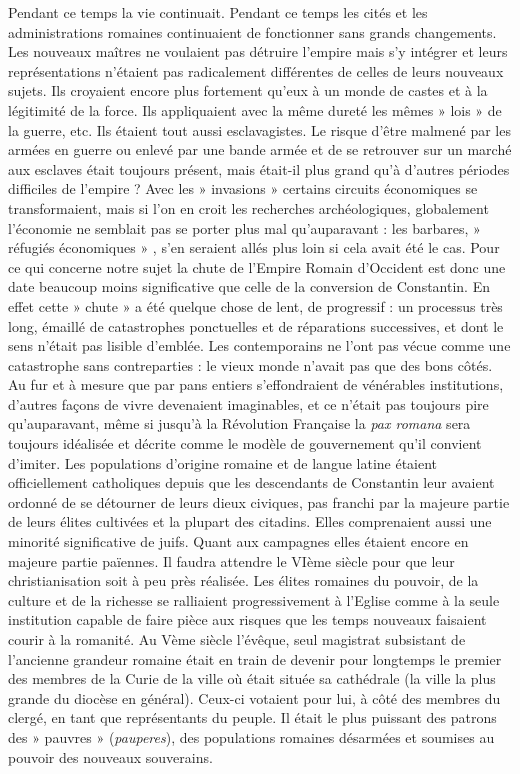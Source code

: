  Pendant ce temps la vie continuait. Pendant ce temps les cités et les administrations romaines continuaient de fonctionner sans grands changements. Les nouveaux maîtres ne voulaient pas détruire l'empire mais s'y intégrer et leurs représentations n'étaient pas radicalement différentes de celles de leurs nouveaux sujets. Ils croyaient encore plus fortement qu'eux à un monde de castes et à la légitimité de la force. Ils appliquaient avec la même dureté les mêmes » lois » de la guerre, etc. Ils étaient tout aussi esclavagistes. Le risque d'être malmené par les armées en guerre ou enlevé par une bande armée et de se retrouver sur un marché aux esclaves était toujours présent, mais était-il plus grand qu'à d'autres périodes difficiles de l'empire ? Avec les » invasions » certains circuits économiques se transformaient, mais si l'on en croit les recherches archéologiques, globalement l'économie ne semblait pas se porter plus mal qu'auparavant : les barbares, » réfugiés économiques » , s'en seraient allés plus loin si cela avait été le cas.
 Pour ce qui concerne notre sujet la chute de l'Empire Romain d'Occident est donc une date beaucoup moins significative que celle de la conversion de Constantin. En effet cette » chute » a été quelque chose de lent, de progressif : un processus très long, émaillé de catastrophes ponctuelles et de réparations successives, et dont le sens n'était pas lisible d'emblée. Les contemporains ne l'ont pas vécue comme une catastrophe sans contreparties : le vieux monde n'avait pas que des bons côtés. Au fur et à mesure que par pans entiers s'effondraient de vénérables institutions, d'autres façons de vivre devenaient imaginables, et ce n'était pas toujours pire qu'auparavant, même si jusqu'à la Révolution Française la \emph{pax romana} sera toujours idéalisée et décrite comme le modèle de gouvernement qu'il convient d'imiter. 
 Les populations d'origine romaine et de langue latine étaient officiellement catholiques depuis que les descendants de Constantin leur avaient ordonné de se détourner de leurs dieux civiques, pas franchi par la majeure partie de leurs élites cultivées et la plupart des citadins. Elles comprenaient aussi une minorité significative de juifs. Quant aux campagnes elles étaient encore en majeure partie païennes. Il faudra attendre le VIème siècle pour que leur christianisation soit à peu près réalisée. Les élites romaines du pouvoir, de la culture et de la richesse se ralliaient progressivement à l'Eglise comme à la seule institution capable de faire pièce aux risques que les temps nouveaux faisaient courir à la romanité. Au Vème siècle l'évêque, seul magistrat subsistant de l'ancienne grandeur romaine était en train de devenir pour longtemps le premier des membres de la Curie de la ville où était située sa cathédrale (la ville la plus grande du diocèse en général). Ceux-ci votaient pour lui, à côté des membres du clergé, en tant que représentants du peuple. Il était le plus puissant des patrons des » pauvres » (\emph{pauperes}), des populations romaines désarmées et soumises au pouvoir des nouveaux souverains. 

